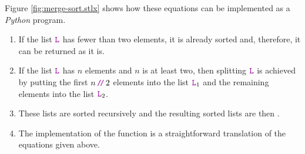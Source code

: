 Figure \ref{fig:merge-sort.stlx} shows how these equations can be implemented as a \textsl{Python}
program.  
\begin{enumerate}
\item If the list $\mytt{L}$ has fewer than two elements, it is already sorted and, therefore, it
      can be returned as it is.
\item If the list $\mytt{L}$ has $n$ elements and $n$ is at least two, then splitting $\mytt{L}$ is achieved by putting the
      first $n\dv 2$ 
      elements into the list $\mytt{L}_1$ and the remaining elements into the list $\mytt{L}_2$.
\item These lists are sorted recursively and the resulting sorted lists are then .
\item The implementation of the function  is a straightforward translation of the equations
      given above.
\end{enumerate}

